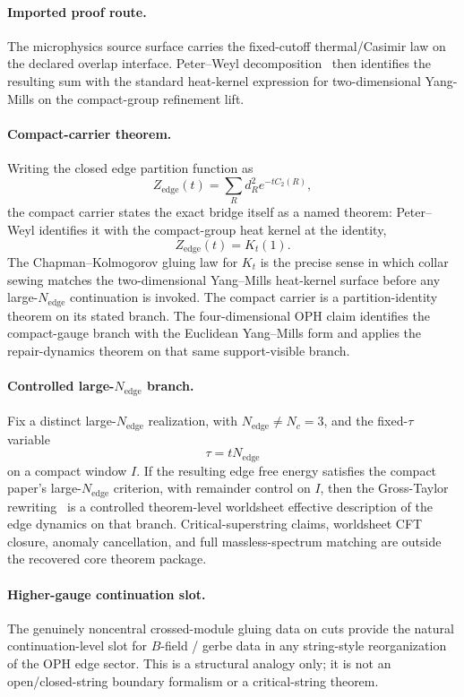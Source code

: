 \paragraph{Imported proof route.}
The microphysics source surface carries the fixed-cutoff thermal/Casimir law on the declared
overlap interface. Peter--Weyl decomposition~\cite{peterWeyl27}
then identifies the resulting sum with the standard heat-kernel expression for
two-dimensional Yang-Mills on the compact-group refinement lift.

\paragraph{Compact-carrier theorem.}
Writing the closed edge partition function as
\[
Z_{\mathrm{edge}}(t)=\sum_R d_R^2 e^{-tC_2(R)},
\]
the compact carrier states the exact bridge itself as a named theorem: Peter--Weyl identifies it with the compact-group heat kernel at the identity,
\[
Z_{\mathrm{edge}}(t)=K_t(1).
\]
The Chapman--Kolmogorov gluing law for \(K_t\) is the precise sense in which collar sewing
matches the two-dimensional Yang--Mills heat-kernel surface before any large-\(N_{\mathrm{edge}}\)
continuation is invoked.
The compact carrier is a partition-identity theorem on its stated branch. The four-dimensional OPH
claim identifies the compact-gauge branch with the Euclidean Yang--Mills form and applies the
repair-dynamics theorem on that same support-visible branch.

\paragraph{Controlled large-\(N_{\mathrm{edge}}\) branch.}
Fix a distinct large-\(N_{\mathrm{edge}}\) realization, with \(N_{\mathrm{edge}}\neq N_c=3\), and
the fixed-\(\tau\) variable
\[
\tau=tN_{\mathrm{edge}}
\]
on a compact window \(I\). If the resulting edge free energy satisfies the compact paper's
large-\(N_{\mathrm{edge}}\) criterion, with remainder control on \(I\), then the Gross-Taylor
rewriting~\cite{grossTaylor93} is a controlled theorem-level worldsheet effective description of
the edge dynamics on that branch. Critical-superstring claims, worldsheet CFT closure, anomaly
cancellation, and full massless-spectrum matching are outside the recovered core theorem package.

\paragraph{Higher-gauge continuation slot.}
The genuinely noncentral crossed-module gluing data on cuts provide the natural continuation-level
slot for \(B\)-field / gerbe data in any string-style reorganization of the OPH edge sector. This
is a structural analogy only; it is not an open/closed-string boundary formalism or a
critical-string theorem.

